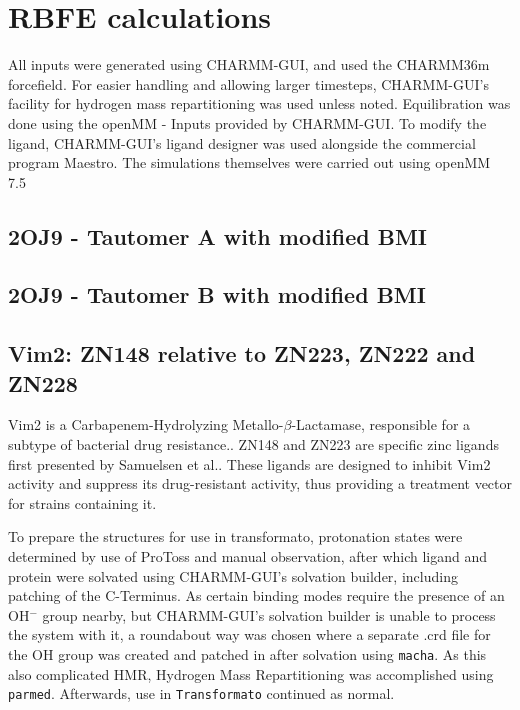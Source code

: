 \documentclass[oneside]{scrreprt}
\begin{document}
\section{RBFE calculations}
All inputs were generated using CHARMM-GUI\supercite{Jo2008Aug}, and used the CHARMM36m forcefield\supercite{Huang2017Jan}. For easier handling and allowing larger timesteps, CHARMM-GUI's facility for hydrogen mass repartitioning\supercite{Gao2021Feb} was used unless noted. Equilibration was done using the openMM - Inputs provided by CHARMM-GUI\supercite{Brooks2009Jul,Lee2016Jan}. To modify the ligand, CHARMM-GUI's ligand designer\supercite{Guterres2021Nov} was used alongside the commercial program Maestro\supercite{maestro}. The simulations themselves were carried out using openMM 7.5\supercite{Eastman2017Jul}


\subsection{2OJ9 - Tautomer A with modified BMI}
\subsection{2OJ9 - Tautomer B with modified BMI}
\subsection{Vim2: ZN148 relative to ZN223, ZN222 and ZN228}
Vim2 is a Carbapenem-Hydrolyzing Metallo-$\beta$-Lactamase, responsible for a subtype of bacterial drug resistance.\supercite{Poirel2000Apr}. ZN148 and ZN223 are specific zinc ligands first presented by Samuelsen et al.\supercite{Samuelsen2020Jun}. These ligands are designed to inhibit Vim2 activity and suppress its drug-resistant activity, thus providing a treatment vector for strains containing it. 

To prepare the structures for use in transformato, protonation states were determined by use of ProToss\supercite{Lippert2009Dec,Bietz2014Dec} and manual observation, after which ligand and protein were solvated using CHARMM-GUI's solvation builder, including patching of the C-Terminus. As certain binding modes require the presence of an OH$^-$ group nearby, but CHARMM-GUI's solvation builder is unable to process the system with it, a roundabout way was chosen where a separate .crd file for the OH group was created and patched in after solvation using \texttt{macha}\supercite{twotoneblue2022May}. As this also complicated HMR, Hydrogen Mass Repartitioning was accomplished using \texttt{parmed}\supercite{Shirts2016Sep}. Afterwards, use in \texttt{Transformato} continued as normal.
\end{document}

